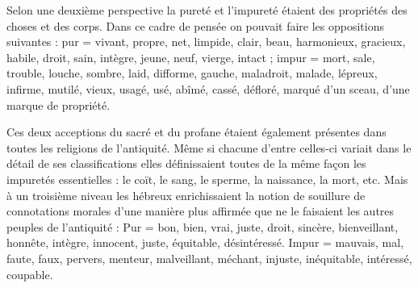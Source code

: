  Selon une deuxième perspective la pureté et l'impureté étaient des propriétés des choses et des corps. Dans ce cadre de pensée on pouvait faire les oppositions suivantes : pur = vivant, propre, net, limpide, clair, beau, harmonieux, gracieux, habile, droit, sain, intègre, jeune, neuf, vierge, intact ; impur = mort, sale, trouble, louche, sombre, laid, difforme, gauche, maladroit, malade, lépreux, infirme, mutilé, vieux, usagé, usé, abîmé, cassé, défloré, marqué d'un sceau, d'une marque de propriété.

 Ces deux acceptions du sacré et du profane étaient également présentes dans toutes les religions de l'antiquité. Même si chacune d'entre celles-ci variait dans le détail de ses classifications elles définissaient toutes de la même façon les impuretés essentielles : le coït, le sang, le sperme, la naissance, la mort, etc. Mais à un troisième niveau les hébreux enrichissaient la notion de souillure de connotations morales d'une manière plus affirmée que ne le faisaient les autres peuples de l'antiquité : Pur = bon, bien, vrai, juste, droit, sincère, bienveillant, honnête, intègre, innocent, juste, équitable, désintéressé. Impur = mauvais, mal, faute, faux, pervers, menteur, malveillant, méchant, injuste, inéquitable, intéressé, coupable.

